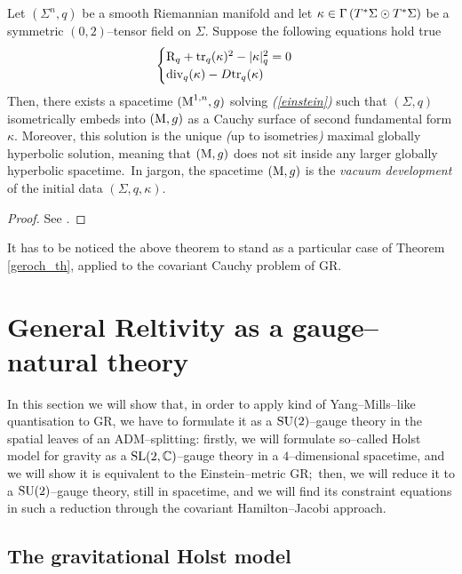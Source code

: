 \newpage
\begin{teo}\label{geroch}
    Let $(\Sigma^n,q)$ be a smooth Riemannian manifold and let $\kappa\in\Gamma\left(T^*\Sigma\odot T^*\Sigma\right)$ be a symmetric $(0,2)$--tensor field on $\Sigma$. Suppose the following equations hold true
    $$\begin{cases}
    \text{\normalfont R}_q+\text{\normalfont tr}_q(\kappa)^2-|\kappa|_q^2=0\\
        \text{\normalfont div}_q(\kappa)-D\text{\normalfont tr}_q(\kappa)
    \end{cases}
    $$
    Then, there exists a spacetime $(\text{\normalfont M}^{1,n},g)$ solving \emph{(\ref{einstein})} %
    such that $(\Sigma,q)$ isometrically embeds into $(\text{\normalfont M},g)$ as a Cauchy surface of second fundamental form $\kappa$. Moreover, this solution is the unique \emph{(}up to isometries\emph{)} maximal globally hyperbolic solution, meaning that $(\text{\normalfont M},g)$ does not sit inside any larger globally hyperbolic spacetime.\, In jargon, the spacetime $(\text{\normalfont M},g)$ is the \emph{vacuum development} of the initial data $(\Sigma,q,\kappa)$.
\end{teo}
\begin{proof}
    See \cite{geroch}.
\end{proof}
It has to be noticed the above theorem to stand as a particular case of Theorem \ref{geroch_th}, applied to the covariant Cauchy problem of GR.



\newpage
\section{General Reltivity as a gauge--natural theory}\label{gauge_GR}

In this section we will show that, in order to apply kind of Yang--Mills--like quantisation to GR, we have to formulate it as a $\text{\normalfont SU}(2)$--gauge theory in the spatial leaves of an ADM--splitting: firstly, we will formulate so--called Holst model for gravity as a $\text{\normalfont SL}(2,\mathbb{C})$--gauge theory in a $4$--dimensional spacetime, and we will show it is equivalent to the Einstein--metric GR;\, then, we will reduce it to a $\text{\normalfont SU}(2)$--gauge theory, still in spacetime, and we will find its constraint equations in such a reduction through the covariant Hamilton--Jacobi approach.


\subsection{The gravitational Holst model}

